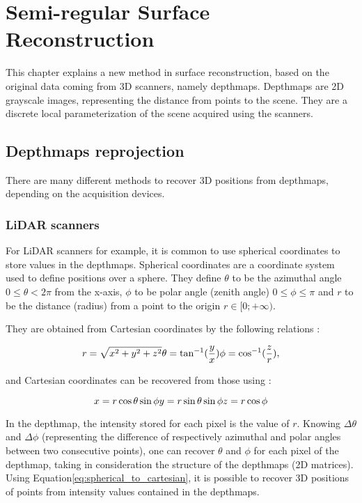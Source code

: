 \documentclass[11pt,fleqn]{book} %
\begin{document}
\chapter{Semi-regular Surface Reconstruction}

This chapter explains a new method in surface reconstruction, based on the original data coming from 3D scanners, namely depthmaps.
Depthmaps are 2D grayscale images, representing the distance from points to the scene. They are a discrete local parameterization of the scene acquired using the scanners.

\section{Depthmaps reprojection}
There are many different methods to recover 3D positions from depthmaps, depending on the acquisition devices.

\subsection{LiDAR scanners}
For LiDAR scanners for example, it is common to use spherical coordinates to store values in the depthmaps.
Spherical coordinates \cite{Wal67} are a coordinate system used to define positions over a sphere. 
They define $\theta$ to be the azimuthal angle $0 \leq \theta < 2\pi$ from the x-axis, $\phi$ to be polar angle (zenith angle) $0 \leq \phi \leq \pi$ and $r$ to be the distance (radius) from a point to the origin $r \in [0;+\infty)$.

They are obtained from Cartesian coordinates by the following relations : 

\begin{equation}
\label{eq:cartesian_to_spherical}
	r = \sqrt{x^2 + y^2 + z^2} \\
	\theta = \tan^{-1}(\frac{y}{x})\\
	\phi = \cos^{-1}(\frac{z}{r}),
\end{equation}

and Cartesian coordinates can be recovered from those using : 

\begin{equation}
\label{eq:spherical_to_cartesian}
	x = r\cos\theta\sin\phi\\
	y = r\sin\theta\sin\phi\\
	z = r\cos\phi
\end{equation}

In the depthmap, the intensity stored for each pixel is the value of $r$. Knowing $\Delta\theta$ and $\Delta\phi$ (representing the difference of respectively azimuthal and polar angles between two consecutive points), one can recover $\theta$ and $\phi$ for each pixel of the depthmap, taking in consideration the structure of the depthmaps (2D matrices). 
Using Equation\eqref{eq:spherical_to_cartesian}, it is possible to recover 3D positions of points from intensity values contained in the depthmaps.
\end{document}
